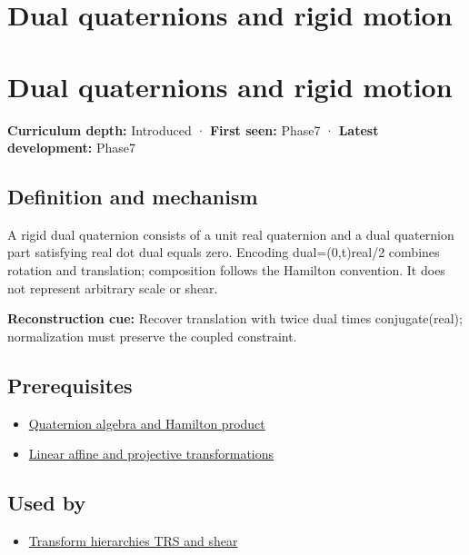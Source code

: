 \hypertarget{appendix-d1ea57347893}{}
\section*{Dual quaternions and rigid motion}
\section{Dual quaternions and rigid motion}\label{appendix-d1ea57347893-dual-quaternions-and-rigid-motion}

\textbf{Curriculum depth:} Introduced · \textbf{First seen:} Phase7 · \textbf{Latest development:} Phase7

\subsection{Definition and mechanism}\label{appendix-d1ea57347893-definition-and-mechanism}

A rigid dual quaternion consists of a unit real quaternion and a dual quaternion part satisfying real dot dual equals zero. Encoding dual=(0,t)real/2 combines rotation and translation; composition follows the Hamilton convention. It does not represent arbitrary scale or shear.

\textbf{Reconstruction cue:} Recover translation with twice dual times conjugate(real); normalization must preserve the coupled constraint.

\subsection{Prerequisites}\label{appendix-d1ea57347893-prerequisites}

\begin{itemize}
\tightlist
\item
  \hyperref[appendix-965d9260eeab]{Quaternion algebra and Hamilton product}
\item
  \hyperref[appendix-0bf0ca73f735]{Linear affine and projective transformations}
\end{itemize}

\subsection{Used by}\label{appendix-d1ea57347893-used-by}

\begin{itemize}
\tightlist
\item
  \hyperref[appendix-292c061cd47c]{Transform hierarchies TRS and shear}
\end{itemize}

